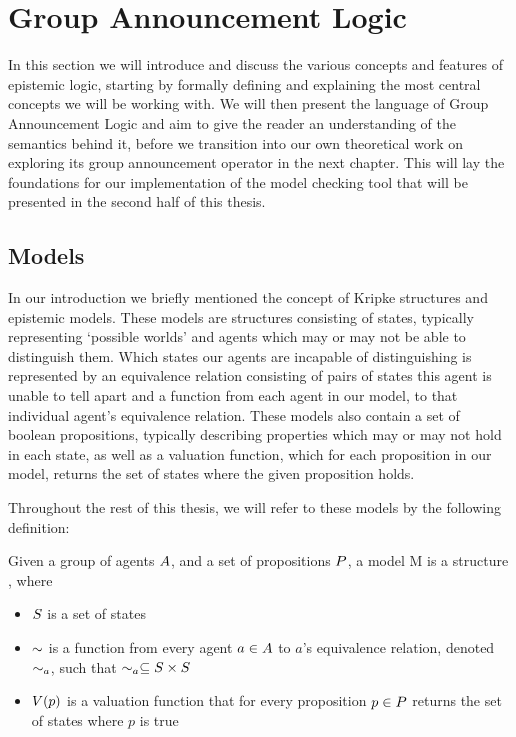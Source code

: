 \section{Group Announcement Logic}\label{sec:theory}

In this section we will introduce and discuss the various concepts and features of epistemic logic, starting by formally defining and explaining the most central concepts we will be working with. We will then present the language of Group Announcement Logic and aim to give the reader an understanding of the semantics behind it, before we transition into our own theoretical work on exploring its group announcement operator in the next chapter. This will lay the foundations for our implementation of the model checking tool that will be presented in the second half of this thesis.

\subsection{Models}

In our introduction we briefly mentioned the concept of Kripke structures and epistemic models. These models are structures consisting of states, typically representing `possible worlds' and agents which may or may not be able to distinguish them. Which states our agents are incapable of distinguishing is represented by an equivalence relation consisting of pairs of states this agent is unable to tell apart and a function from each agent in our model, to that individual agent's equivalence relation. These models also contain a set of boolean propositions, typically describing properties which may or may not hold in each state, as well as a valuation function, which for each proposition in our model, returns the set of states where the given proposition holds.

Throughout the rest of this thesis, we will refer to these models by the following definition: 

\begin{definition}[Models]\label{def:model}
	Given a group of agents $A$, and a set of propositions $P$, a model M is a structure \model{} , where
	\begin{itemize}
		\item $S$ is a set of states
		\item $\sim$ is a function from every agent $a \in A$ to $a$'s equivalence relation, denoted $\sim_a$, such that $\sim_a \subseteq S\times S$
		\item $V(p)$ is a valuation function that for every proposition $p \in P$ returns the set of states where $p$ is true
	\end{itemize}
\end{definition}

